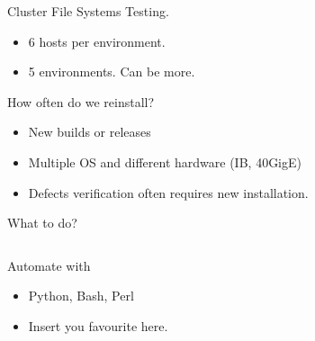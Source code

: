 \documentclass[16pt]{beamer}
\begin{document}
\begin{frame}{Cluster File Systems Testing.}
  \begin{itemize}
  \item
  6 hosts per environment. 
  \item
  5 environments. Can be more.
  \end{itemize}
  How often do we reinstall?
  \begin{itemize}
  \item
  New builds or releases
  \item
  Multiple OS and different hardware (IB, 40GigE)
  \item
  Defects verification often requires new installation.
  \end{itemize}
\end{frame}

\begin{frame}{What to do?}
\begin{columns}[T]
  \begin{column}{.6\textwidth}
        Automate with 
        \begin{itemize}
        \item
        Python, Bash, Perl
        \item
        Insert you favourite here.
        \end{itemize}


\end{column}
\end{columns}
\end{frame}
\end{document}
